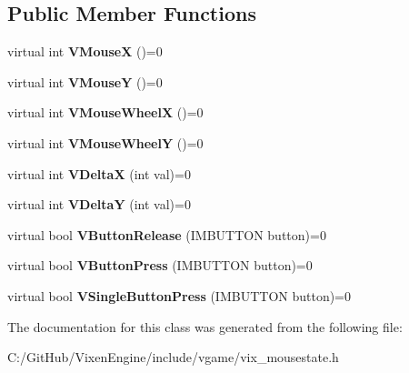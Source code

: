 \subsection*{Public Member Functions}
\begin{DoxyCompactItemize}
\item 
\hypertarget{class_vixen_1_1_i_mouse_state_a3f5c5aae38dd8f5306b1f7946df61d5d}{}virtual int {\bfseries V\+Mouse\+X} ()=0\label{class_vixen_1_1_i_mouse_state_a3f5c5aae38dd8f5306b1f7946df61d5d}

\item 
\hypertarget{class_vixen_1_1_i_mouse_state_a308d6b6cc56b917c696d3c4c9cb899b3}{}virtual int {\bfseries V\+Mouse\+Y} ()=0\label{class_vixen_1_1_i_mouse_state_a308d6b6cc56b917c696d3c4c9cb899b3}

\item 
\hypertarget{class_vixen_1_1_i_mouse_state_a58e7dbb0554a75c0a233974417678569}{}virtual int {\bfseries V\+Mouse\+Wheel\+X} ()=0\label{class_vixen_1_1_i_mouse_state_a58e7dbb0554a75c0a233974417678569}

\item 
\hypertarget{class_vixen_1_1_i_mouse_state_aefc16483569b98383ef1d677e2df8271}{}virtual int {\bfseries V\+Mouse\+Wheel\+Y} ()=0\label{class_vixen_1_1_i_mouse_state_aefc16483569b98383ef1d677e2df8271}

\item 
\hypertarget{class_vixen_1_1_i_mouse_state_ace74f0261127b268e0d43bf119d88dd0}{}virtual int {\bfseries V\+Delta\+X} (int val)=0\label{class_vixen_1_1_i_mouse_state_ace74f0261127b268e0d43bf119d88dd0}

\item 
\hypertarget{class_vixen_1_1_i_mouse_state_a1ab794dd67451ba6aa7252dcda98e810}{}virtual int {\bfseries V\+Delta\+Y} (int val)=0\label{class_vixen_1_1_i_mouse_state_a1ab794dd67451ba6aa7252dcda98e810}

\item 
\hypertarget{class_vixen_1_1_i_mouse_state_a29b42a39e8512d367db575a268397806}{}virtual bool {\bfseries V\+Button\+Release} (I\+M\+B\+U\+T\+T\+O\+N button)=0\label{class_vixen_1_1_i_mouse_state_a29b42a39e8512d367db575a268397806}

\item 
\hypertarget{class_vixen_1_1_i_mouse_state_ab6c17e38f5afc86d1b33992543cbf1b2}{}virtual bool {\bfseries V\+Button\+Press} (I\+M\+B\+U\+T\+T\+O\+N button)=0\label{class_vixen_1_1_i_mouse_state_ab6c17e38f5afc86d1b33992543cbf1b2}

\item 
\hypertarget{class_vixen_1_1_i_mouse_state_a3a6d03dec5ba1b8a9c0b124b63c101ab}{}virtual bool {\bfseries V\+Single\+Button\+Press} (I\+M\+B\+U\+T\+T\+O\+N button)=0\label{class_vixen_1_1_i_mouse_state_a3a6d03dec5ba1b8a9c0b124b63c101ab}

\end{DoxyCompactItemize}


The documentation for this class was generated from the following file\+:\begin{DoxyCompactItemize}
\item 
C\+:/\+Git\+Hub/\+Vixen\+Engine/include/vgame/vix\+\_\+mousestate.\+h\end{DoxyCompactItemize}
